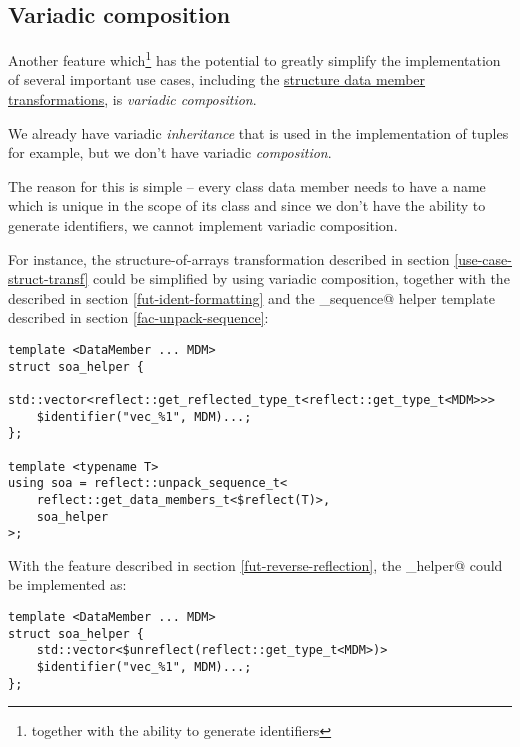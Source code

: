 \subsection{Variadic composition}
\label{fut-variadic-composition}

Another feature which\footnote{together with the ability to generate identifiers}
has the potential to greatly simplify the implementation of several important
use cases, including the \hyperref[use-case-struct-transf]{structure data
member transformations}, is {\em variadic composition}.

We already have variadic {\em inheritance} that is used in the implementation
of tuples for example, but we don't have variadic {\em composition}.

The reason for this is simple -- every class data member needs to have a name
which is unique in the scope of its class and since we don't have the ability
to generate identifiers, we cannot implement variadic composition.

For instance, the structure-of-arrays transformation described in section
\ref{use-case-struct-transf} could be simplified by using variadic composition,
together with the  described in section
\ref{fut-ident-formatting} and the \verb@unpack_sequence@ helper template
described in section \ref{fac-unpack-sequence}:

\begin{verbatim}
template <DataMember ... MDM>
struct soa_helper {
	std::vector<reflect::get_reflected_type_t<reflect::get_type_t<MDM>>>
	$identifier("vec_%1", MDM)...;
};

template <typename T>
using soa = reflect::unpack_sequence_t<
	reflect::get_data_members_t<$reflect(T)>,
	soa_helper
>;
\end{verbatim}

With the  feature described in section
\ref{fut-reverse-reflection}, the \verb@soa_helper@ could be implemented as:

\begin{verbatim}
template <DataMember ... MDM>
struct soa_helper {
	std::vector<$unreflect(reflect::get_type_t<MDM>)>
	$identifier("vec_%1", MDM)...;
};
\end{verbatim}
